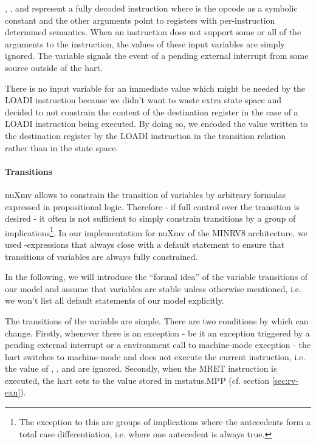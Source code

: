 , ,  and  represent a fully decoded instruction where  is the opcode as a symbolic constant and the other arguments point to registers with per-instruction determined semantics.
When an instruction does not support some or all of the arguments to the instruction, the values of these input variables are simply ignored.
The variable  signals the event of a pending external interrupt from some source outside of the \gls{hart}.

There is no input variable for an immediate value which might be needed by the LOADI instruction because we didn't want to waste extra state space and decided to not constrain the content of the destination register in the case of a LOADI instruction being executed.
By doing so, we encoded the value written to the destination register by the LOADI instruction in the transition relation rather than in the state space.

\paragraph{Transitions}
nuXmv allows to constrain the transition of variables by arbitrary formulas expressed in propositional logic.
Therefore - if full control over the transition is desired - it often is not sufficient to simply constrain transitions by a group of implications\footnote{%
    The exception to this are groups of implications where the antecedents form a total case differentiation, i.e. where one antecedent is always true.
}.
In our implementation for nuXmv of the MINRV8 architecture, we used -expressions that always close with a default statement to ensure that transitions of variables are always fully constrained.

In the following, we will introduce the \enquote{formal idea} of the variable transitions of our model and assume that variables are stable unless otherwise mentioned, i.e. we won't list all default statements of our model explicitly.

The transitions of the  variable are simple.
There are two conditions by which  can change.
Firstly, whenever there is an exception - be it an exception triggered by a pending external interrupt or a environment call to machine-mode exception - the \gls{hart} switches to machine-mode and does not execute the current instruction, i.e. the value of , ,  and  are ignored.
Secondly, when the MRET instruction is executed, the \gls{hart} sets  to the value stored in \gls{mstatus}.MPP (cf. section \ref{sec:rv-exn}).

